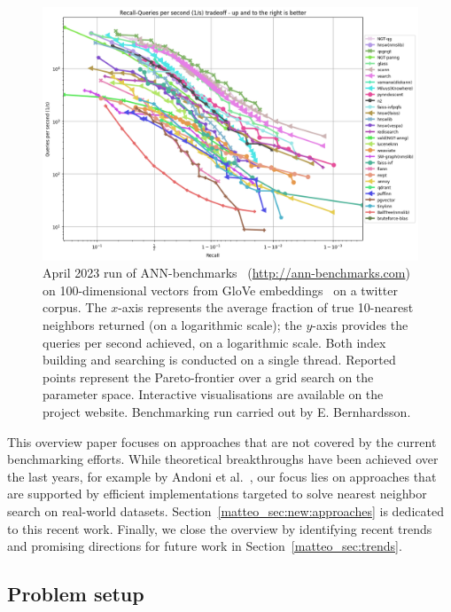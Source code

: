 \documentclass[11pt]{article}
\begin{document}
\begin{figure}[t!]
	\includegraphics*[width=\textwidth]{submissions/Matteo2023/figures/glove-100-angular.png}
	\caption{April 2023 run of ANN-benchmarks~\cite{DBLP:journals/is/AumullerBF20} (\url{http://ann-benchmarks.com}) on 100-dimensional vectors from GloVe embeddings~\cite{DBLP:conf/emnlp/PenningtonSM14} on a twitter corpus.
		The $x$-axis represents the average fraction of true 10-nearest neighbors returned (on a logarithmic scale); the $y$-axis provides the queries per second achieved, on a logarithmic scale.
		Both index building and searching is conducted on a single thread.
		Reported points represent the Pareto-frontier over a grid search on the parameter space.
		Interactive visualisations are available on the project website.
		Benchmarking run carried out by E. Bernhardsson.}
	\label{matteo_fig:glove}
\end{figure}

This overview paper focuses on approaches that are not covered by the current benchmarking efforts.
While theoretical breakthroughs have been achieved over the last years, for example by Andoni et al.~\cite{DBLP:conf/soda/AndoniNRW21}, our focus lies on approaches that are supported by efficient implementations targeted to solve nearest neighbor search on real-world datasets.
Section~\ref{matteo_sec:new:approaches} is dedicated to this recent work.
Finally, we close the overview by identifying recent trends and promising directions for future work in Section~\ref{matteo_sec:trends}.

\subsection{Problem setup}
\end{document}
